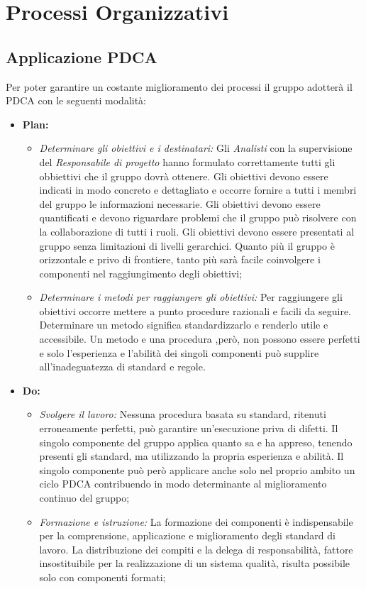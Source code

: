 \section{Processi Organizzativi}
\subsection{Applicazione PDCA}
Per poter garantire un costante miglioramento dei processi il gruppo \gruppo adotterà il PDCA con le seguenti modalità:
\begin{itemize}
\item \textbf{Plan:}
  \begin{itemize}
  \item \emph{Determinare gli obiettivi e i destinatari:} Gli \emph{Analisti} con la supervisione del \emph{Responsabile di progetto} hanno formulato correttamente tutti gli obbiettivi che il gruppo dovrà ottenere. Gli obiettivi devono essere indicati in modo concreto e dettagliato e occorre fornire a tutti i membri del gruppo le informazioni necessarie. Gli obiettivi devono essere quantificati e devono riguardare  problemi che il gruppo può risolvere con la collaborazione di tutti i ruoli.
  Gli obiettivi devono essere presentati al gruppo senza limitazioni di livelli gerarchici. Quanto più il gruppo è orizzontale e privo di frontiere, tanto più sarà facile coinvolgere i componenti nel raggiungimento degli obiettivi;
  \item \emph{Determinare i metodi per raggiungere gli obiettivi:} Per raggiungere gli obiettivi occorre mettere a punto procedure razionali e facili da seguire. Determinare un metodo significa standardizzarlo e renderlo utile e accessibile.
  Un metodo e una procedura ,però, non possono essere perfetti e solo l’esperienza e l’abilità dei singoli componenti può supplire all’inadeguatezza di standard e regole. 
  \end{itemize}
 \item \textbf{Do:}
 \begin{itemize}
  \item \emph{Svolgere il lavoro:} Nessuna procedura basata su standard, ritenuti erroneamente perfetti, può garantire un’esecuzione priva di difetti. Il singolo componente del gruppo applica quanto sa e ha appreso, tenendo presenti gli standard, ma utilizzando la propria  esperienza e abilità. Il singolo componente può però applicare anche solo nel  proprio ambito un ciclo PDCA contribuendo in modo determinante al miglioramento continuo del gruppo;
  \item \emph{Formazione e istruzione:} La formazione dei componenti è indispensabile per la comprensione, applicazione e miglioramento degli standard di lavoro. La distribuzione dei compiti e la delega di responsabilità, fattore insostituibile per la realizzazione di un sistema qualità, risulta possibile solo con componenti formati;

\end{itemize}
\end{itemize}
